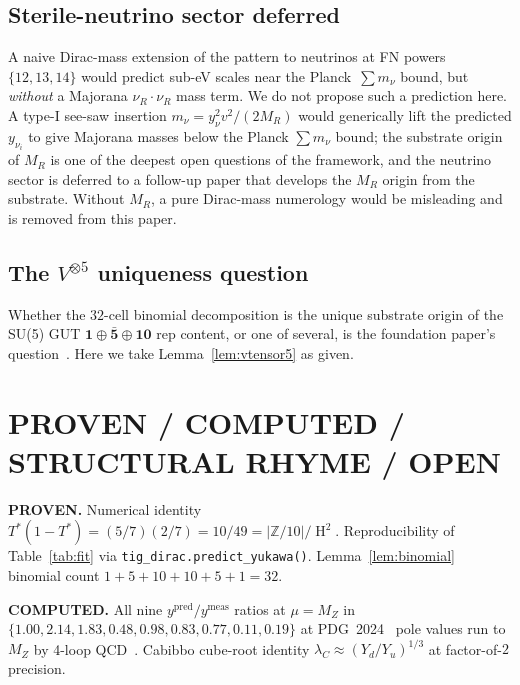 \documentclass[11pt,reqno]{amsart}
\theoremstyle{plain}
\theoremstyle{definition}
\theoremstyle{remark}
\newcommand{\Z}{\mathbb{Z}}
\DeclareMathOperator{\HARM}{H}    %
\newcommand{\rep}[1]{\mathbf{#1}}
\newcommand{\barrep}[1]{\bar{\mathbf{#1}}}
\begin{document}
\subsection{Sterile-neutrino sector deferred}
A naive Dirac-mass extension of the pattern to neutrinos at FN
powers $\{12, 13, 14\}$ would predict sub-eV scales near the
Planck~$\sum m_{\nu}$ bound, but \emph{without} a Majorana
$\nu_{R} \cdot \nu_{R}$ mass term. We do not propose such a
prediction here. A type-I see-saw insertion $m_{\nu} =
y_{\nu}^{2} v^{2}/(2 M_{R})$ would generically lift the
predicted $y_{\nu_{i}}$ to give Majorana masses below the
Planck $\sum m_{\nu}$ bound; the substrate origin of $M_{R}$
is one of the deepest open questions of the framework, and
the neutrino sector is deferred to a follow-up paper that
develops the $M_R$ origin from the substrate. Without
$M_R$, a pure Dirac-mass numerology would be misleading and
is removed from this paper.

\subsection{The $V^{\otimes 5}$ uniqueness question}
Whether the $32$-cell binomial decomposition is the unique
substrate origin of the SU(5) GUT $\rep{1} \oplus \barrep{5}
\oplus \rep{10}$ rep content, or one of several, is the
foundation paper's question~\cite{SandersGish2026DiscreteDirac}.
Here we take Lemma~\ref{lem:vtensor5} as given.

\section*{PROVEN / COMPUTED / STRUCTURAL RHYME / OPEN}\label{sec:scope}

\noindent\textbf{PROVEN.} Numerical identity $T^*(1-T^*) =
(5/7)(2/7) = 10/49 = |\Z/10|/\HARM^{2}$. Reproducibility of
Table~\ref{tab:fit} via \texttt{tig\_dirac.predict\_yukawa()}.
Lemma~\ref{lem:binomial} binomial count $1+5+10+10+5+1 = 32$.

\noindent\textbf{COMPUTED.} All nine $y^{\mathrm{pred}}/
y^{\mathrm{meas}}$ ratios at $\mu = M_Z$ in $\{1.00, 2.14,
1.83, 0.48, 0.98, 0.83, 0.77, 0.11, 0.19\}$ at
PDG~2024~\cite{PDG2024} pole values run to $M_Z$ by
4-loop QCD~\cite{MihailaSalomonSteinhauser2012}. Cabibbo
cube-root identity $\lambda_C \approx (Y_d/Y_u)^{1/3}$ at
factor-of-$2$ precision.
\end{document}
